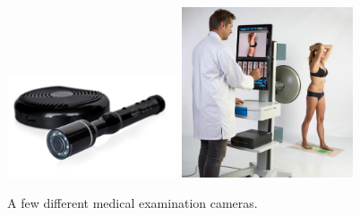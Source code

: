 \begin{figure}[h!]
  \centering
    \includegraphics[width=0.45\textwidth]{Chapter5/Figs/TEHD_1.png}
    \includegraphics[width=0.45\textwidth]{Chapter5/Figs/examination-clinical-dermoscan-x2.jpg}
    \caption{A few different medical examination cameras. }\label{fig:MedicalExaminationCameras}
\end{figure}
%
%
